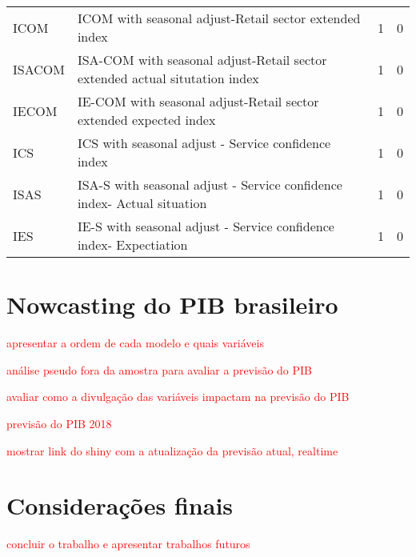 \documentclass{article}
\begin{document}
\begin{landscape}
\begin{center}
\begin{longtable}{|l|l|l|l|}
ICOM & ICOM with seasonal adjust-Retail sector extended index & 1 & 0 \\
ISACOM & ISA-COM with seasonal adjust-Retail sector extended actual situtation index & 1 & 0 \\
IECOM & IE-COM with seasonal adjust-Retail sector extended expected index & 1 & 0 \\
ICS & ICS with seasonal adjust - Service confidence index & 1 & 0 \\
ISAS & ISA-S with seasonal adjust - Service confidence index- Actual situation & 1 & 0 \\
IES & IE-S with seasonal adjust - Service confidence index- Expectiation & 1 & 0 \\ 

\end{longtable}
\end{center}
\end{landscape}


\section{Nowcasting do PIB brasileiro}\label{nowcastingBR}

\textcolor{red}{apresentar a ordem de cada modelo e quais variáveis}

\textcolor{red}{análise pseudo fora da amostra para avaliar a previsão do PIB}

\textcolor{red}{avaliar como a divulgação das variáveis impactam na previsão do PIB}

\textcolor{red}{previsão do PIB 2018}

\textcolor{red}{mostrar link do shiny com a atualização da previsão atual, realtime}

\section{Considerações finais}\label{conclusao}

\textcolor{red}{concluir o trabalho e apresentar trabalhos futuros}



\end{document}
